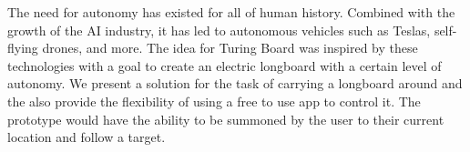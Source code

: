 
The need for autonomy has existed for all of human history. Combined with the growth of the AI industry, it has led to autonomous vehicles such as Teslas, self-flying drones, and more. The idea for Turing Board was inspired by these technologies with a  goal to create an electric longboard with a certain level of autonomy. We present a solution for the task of carrying a longboard around and the also provide the flexibility of using a free to use app to control it. The prototype would have the ability to be summoned by the user to their current location and follow a target.
